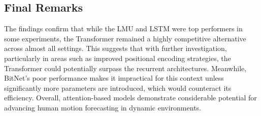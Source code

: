 \subsection*{Final Remarks}
The findings confirm that while the LMU and LSTM were top performers in some experiments, the Transformer remained a highly competitive alternative across almost all settings. This suggests that with further investigation, particularly in areas such as improved positional encoding strategies, the Transformer could potentially surpass the recurrent architectures. Meanwhile, BitNet's poor performance makes it impractical for this context unless significantly more parameters are introduced, which would counteract its efficiency. Overall, attention-based models demonstrate considerable potential for advancing human motion forecasting in dynamic environments.

